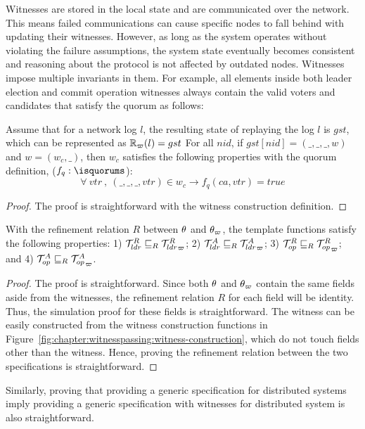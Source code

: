 

Witnesses are stored in the local state and are communicated over the network.
This means failed communications can
cause specific nodes to fall behind with updating their witnesses.
However, as long as the system operates without violating the failure 
assumptions, the system state eventually becomes consistent and reasoning 
about the protocol is not affected by outdated nodes.
Witnesses impose multiple invariants in them.
For example, all elements inside both leader election and commit operation witnesses 
always contain the valid voters and candidates that satisfy the quorum as follows:


\begin{theorem}\label{thm:witness-invariant}
Assume that for a network log $l$, the resulting state of replaying the log $l$ 
	is $gst$, which can be represented as $\mathbb{R}_\varpi(l) = gst$
For all $nid$, if $gst[nid] = (\_, \_, \_, w)$ and $w = (w_c, \_)$, then $w_c$ satisfies the following properties with the quorum definition, ($f_q : \isquorums$):
$$\forall\ vtr\ , \ (\_, \_, \_, vtr) \in w_c \rightarrow f_q(ca, vtr) = true$$
\end{theorem}

\begin{proof}
The proof is straightforward with the witness construction definition.
\end{proof}

\begin{theorem}\label{theorem:chapter:witnesspassing:spec-refine}
With the refinement relation $R$ between $\theta$ and $\theta_\varpi$, 
the template functions satisfy the following properties:
1) $\mathcal{T}^{R}_{ldr}  \sqsubseteq_{R} {\mathcal{T}^{R}_{ldr}}_{\varpi} $; 
2) $\mathcal{T}^{A}_{ldr}  \sqsubseteq_{R} {\mathcal{T}^{A}_{ldr}}_{\varpi} $; 
3) $\mathcal{T}^{R}_{op}  \sqsubseteq_{R} {\mathcal{T}^{R}_{op}}_{\varpi} $; and
4) $\mathcal{T}^{A}_{op}  \sqsubseteq_{R} {\mathcal{T}^{A}_{op}}_{\varpi}$.
\end{theorem}

\begin{proof}
The proof is straightforward. 
Since both $\theta$ and $\theta_\varpi$ contain the same fields aside from
the witnesses, the refinement relation $R$ for each field will be identity.
Thus, the simulation proof for these fields is straightforward. 
The witness can be easily constructed from the witness construction functions
in Figure~\ref{fig:chapter:witnesspassing:witness-construction}, which do not touch fields other
than the witness. 
Hence, proving the refinement relation between the two specifications is
straightforward.
\end{proof}

Similarly, proving that providing a generic specification for distributed
systems imply providing a generic specification with witnesses for distributed
system is also straightforward.


